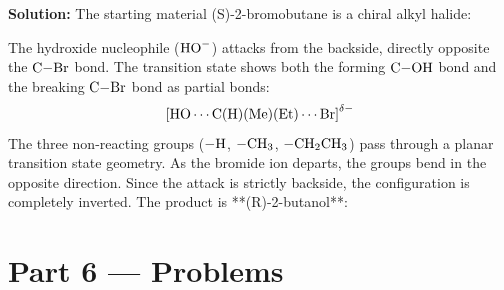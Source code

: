 \documentclass[12pt, a4paper]{book}
\begin{document}
\begin{problembox}
\begin{enumerate}[label=\textbf{E\arabic*.}]
        \textbf{Solution:}
        The starting material (S)-2-bromobutane is a chiral alkyl halide:
        \begin{center}
        \end{center}
        The hydroxide nucleophile ($\ce{HO-}$) attacks from the backside, directly opposite the $\ce{C-Br}$ bond.
        The transition state shows both the forming $\ce{C-OH}$ bond and the breaking $\ce{C-Br}$ bond as partial bonds:
        \[
          \left[ \ce{HO} \cdots \text{C(H)(Me)(Et)} \cdots \ce{Br} \right]^{\delta-}
        \]
        The three non-reacting groups ($-\ce{H}$, $-\ce{CH3}$, $-\ce{CH2CH3}$) pass through a planar transition state geometry.
        As the bromide ion departs, the groups bend in the opposite direction.
        Since the attack is strictly backside, the configuration is completely inverted. The product is **(R)-2-butanol**:
        \begin{center}
        \end{center}
\end{enumerate}
\end{problembox}

\newpage

\section{Part 6 --- Problems}
\end{document}
